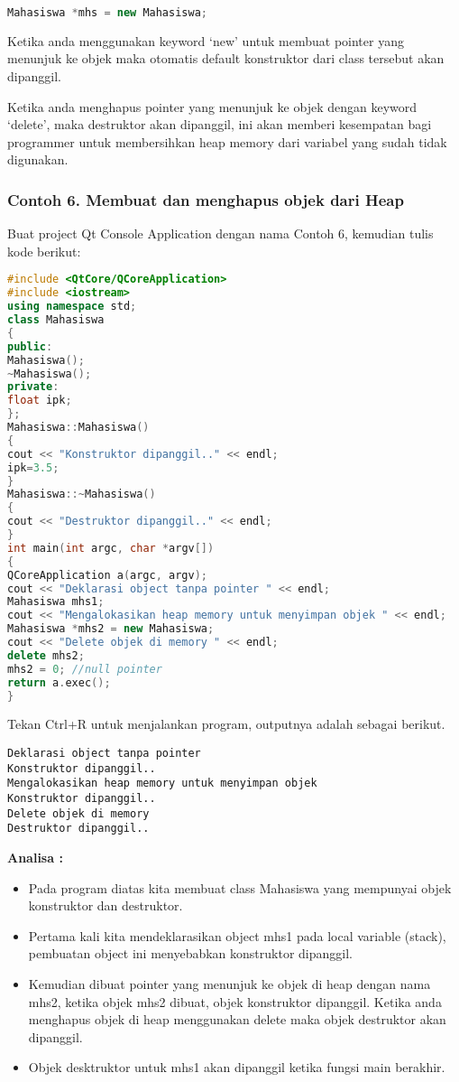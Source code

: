 \begin{lstlisting}[language=c++]
Mahasiswa *mhs = new Mahasiswa;
\end{lstlisting}

Ketika anda menggunakan keyword `new' untuk membuat pointer yang
menunjuk ke objek maka otomatis default konstruktor dari class tersebut
akan dipanggil.

Ketika anda menghapus pointer yang menunjuk ke objek dengan keyword
`delete', maka destruktor akan dipanggil, ini akan memberi kesempatan
bagi programmer untuk membersihkan heap memory dari variabel yang sudah
tidak digunakan.

\subsubsection*{Contoh 6. Membuat dan menghapus objek dari Heap}

Buat project Qt Console Application dengan nama Contoh 6, kemudian tulis
kode berikut:

\begin{lstlisting}[language=c++]
#include <QtCore/QCoreApplication>
#include <iostream>
using namespace std;
class Mahasiswa
{
public:
Mahasiswa();
~Mahasiswa();
private:
float ipk;
};
Mahasiswa::Mahasiswa()
{
cout << "Konstruktor dipanggil.." << endl;
ipk=3.5;
}
Mahasiswa::~Mahasiswa()
{
cout << "Destruktor dipanggil.." << endl;
}
int main(int argc, char *argv[])
{
QCoreApplication a(argc, argv);
cout << "Deklarasi object tanpa pointer " << endl;
Mahasiswa mhs1;
cout << "Mengalokasikan heap memory untuk menyimpan objek " << endl;
Mahasiswa *mhs2 = new Mahasiswa;
cout << "Delete objek di memory " << endl;
delete mhs2;
mhs2 = 0; //null pointer
return a.exec();
}
\end{lstlisting}

Tekan Ctrl+R untuk menjalankan program, outputnya adalah sebagai
berikut.

\begin{verbatim}
Deklarasi object tanpa pointer
Konstruktor dipanggil..
Mengalokasikan heap memory untuk menyimpan objek
Konstruktor dipanggil..
Delete objek di memory
Destruktor dipanggil..
\end{verbatim}

\textbf{Analisa :}

\begin{itemize}
\tightlist
\item
  Pada program diatas kita membuat class Mahasiswa yang mempunyai objek
  konstruktor dan destruktor.
\item
  Pertama kali kita mendeklarasikan object mhs1 pada local variable
  (stack), pembuatan object ini menyebabkan konstruktor dipanggil.
\item
  Kemudian dibuat pointer yang menunjuk ke objek di heap dengan nama
  mhs2, ketika objek mhs2 dibuat, objek konstruktor dipanggil. Ketika
  anda menghapus objek di heap menggunakan delete maka objek destruktor
  akan dipanggil.
\item
  Objek desktruktor untuk mhs1 akan dipanggil ketika fungsi main
  berakhir.
\end{itemize}

